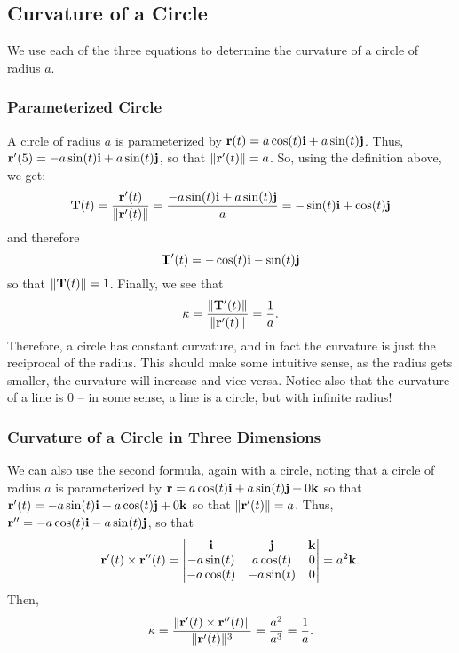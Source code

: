 \subsection{Curvature of a Circle}

We use each of the three equations to determine the curvature of a circle of radius \(a\).

\subsubsection{Parameterized Circle}

A circle of radius \(a\) is parameterized by \(\mathbf{r}(t) = a \cos(t)\mathbf{i} + a \sin(t)\mathbf{j}\). Thus, \(\mathbf{r}'(5) = -a \sin(t)\mathbf{i} + a \sin(t)\mathbf{j}\), so that \(\|\mathbf{r}'(t)\|= a\). So, using the definition above, we get:
\[
    \mathbf{T}(t) = \frac{\mathbf{r}'(t)}{\|\mathbf{r}'(t)\|} = \frac{-a \sin(t)\mathbf{i} + a \sin(t)\mathbf{j}}{a} = -\sin(t)\mathbf{i} + \cos(t)\mathbf{j}
\]
and therefore
\[
    \mathbf{T}'(t) = -\cos(t)\mathbf{i} - \sin(t)\mathbf{j}
\]
so that \(\|\mathbf{T}(t)\|= 1\). Finally, we see that 
\[
    \kappa = \frac{\|\mathbf{T}'(t)\|}{\|\mathbf{r}'(t)\|} = \frac{1}{a}.
\]
Therefore, a circle has constant curvature, and in fact the curvature is just the reciprocal of the radius. This should make some intuitive sense, as the radius gets smaller, the curvature will increase and vice-versa. Notice also that the curvature of a line is 0 -- in some sense, a line is a circle, but with infinite radius!

\subsubsection{Curvature of a Circle in Three Dimensions}

We can also use the second formula, again with a circle, noting that a circle of radius \(a\) is parameterized by \(\mathbf{r} = a \cos(t)\mathbf{i} + a \sin(t)\mathbf{j} + 0\mathbf{k}\) so that \(\mathbf{r}'(t) = -a \sin(t)\mathbf{i} + a \cos(t)\mathbf{j} + 0\mathbf{k}\) so that \(\|\mathbf{r}'(t)\|= a\). Thus, \(\mathbf{r}'' = -a \cos(t)\mathbf{i} - a \sin(t)\mathbf{j}\), so that 
\[
    \mathbf{r}'(t) \times \mathbf{r}''(t) = \begin{vmatrix}
        \mathbf{i} & \mathbf{j} & \mathbf{k} \\
        -a \sin(t) & a \cos(t) & 0 \\
        -a \cos(t) & -a \sin(t) & 0
    \end{vmatrix} = a^{2}\mathbf{k}.
\] 
Then, 
\[
    \kappa = \frac{\|\mathbf{r}'(t) \times \mathbf{r}''(t)\|}{\|\mathbf{r}'(t)\|^{3}} = \frac{a^{2}}{a^{3}} = \frac{1}{a}.
\]

